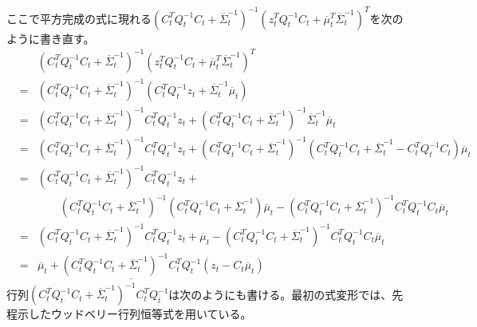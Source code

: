 \documentclass[dvipdfmx,a4paper]{jsarticle}
\begin{document}
ここで平方完成の式に現れる$\left( C_t^T Q_t^{-1} C_t + \overline{\Sigma}_t^{-1} \right)^{-1} \left( z_t^T Q_t^{-1} C_t + \overline{\mu}_t^T \overline{\Sigma}_t^{-1} \right)^T$を次のように書き直す。
\begin{eqnarray}
	&& \left( C_t^T Q_t^{-1} C_t + \overline{\Sigma}_t^{-1} \right)^{-1} \left( z_t^T Q_t^{-1} C_t + \overline{\mu}_t^T \overline{\Sigma}_t^{-1} \right)^T \nonumber \\
	&=& \left( C_t^T Q_t^{-1} C_t + \overline{\Sigma}_t^{-1} \right)^{-1} \left( C_t^T Q_t^{-1} z_t + \overline{\Sigma}_t^{-1} \overline{\mu}_t \right) \nonumber \\
	&=& \left( C_t^T Q_t^{-1} C_t + \overline{\Sigma}_t^{-1} \right)^{-1} C_t^T Q_t^{-1} z_t + \left( C_t^T Q_t^{-1} C_t + \overline{\Sigma}_t^{-1} \right)^{-1} \overline{\Sigma}_t^{-1} \overline{\mu}_t \nonumber \\
	&=& \left( C_t^T Q_t^{-1} C_t + \overline{\Sigma}_t^{-1} \right)^{-1} C_t^T Q_t^{-1} z_t + \left( C_t^T Q_t^{-1} C_t + \overline{\Sigma}_t^{-1} \right)^{-1} \left( C_t^T Q_t^{-1} C_t + \overline{\Sigma}_t^{-1} - C_t^T Q_t^{-1} C_t \right) \overline{\mu}_t \nonumber \\
	&=& \left( C_t^T Q_t^{-1} C_t + \overline{\Sigma}_t^{-1} \right)^{-1} C_t^T Q_t^{-1} z_t + \nonumber \\
	&& \qquad \left( C_t^T Q_t^{-1} C_t + \overline{\Sigma}_t^{-1} \right)^{-1} \left( C_t^T Q_t^{-1} C_t + \overline{\Sigma}_t^{-1} \right) \overline{\mu}_t - \left( C_t^T Q_t^{-1} C_t + \overline{\Sigma}_t^{-1} \right)^{-1} C_t^T Q_t^{-1} C_t \overline{\mu}_t \nonumber \\
	&=& \left( C_t^T Q_t^{-1} C_t + \overline{\Sigma}_t^{-1} \right)^{-1} C_t^T Q_t^{-1} z_t + \overline{\mu}_t - \left( C_t^T Q_t^{-1} C_t + \overline{\Sigma}_t^{-1} \right)^{-1} C_t^T Q_t^{-1} C_t \overline{\mu}_t \nonumber \\
	&=& \overline{\mu}_t + \underline{\left( C_t^T Q_t^{-1} C_t + \overline{\Sigma}_t^{-1} \right)^{-1} C_t^T Q_t^{-1}} \left( z_t - C_t \overline{\mu}_t \right) \label{eq:mu-tmp}
\end{eqnarray}
行列$\left( C_t^T Q_t^{-1} C_t + \overline{\Sigma}_t^{-1} \right)^{-1} C_t^T Q_t^{-1}$は次のようにも書ける。最初の式変形では、先程示したウッドベリー行列恒等式を用いている。
\end{document}
